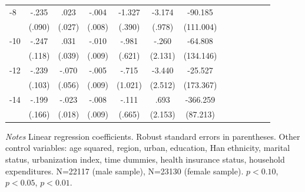 \begin{table}[p]
\begin{adjustbox}{max width=\linewidth}
\begin{threeparttable}
{\begin{tabular}{l*{6}{SS}}
-8             &    -.235\sym{***}&     .023         &    -.004         &   -1.327\sym{***}&   -3.174\sym{***}&  -90.185         \\
                &   (.090)         &   (.027)         &   (.008)         &   (.390)         &   (.978)         &(111.004)         \\
-10            &    -.247\sym{**} &     .031         &    -.010         &    -.981         &    -.260         &  -64.808         \\
                &   (.118)         &   (.039)         &   (.009)         &   (.621)         &  (2.131)         &(134.146)         \\
-12           &    -.239\sym{**} &    -.070         &    -.005         &    -.715         &   -3.440         &  -25.527         \\
                &   (.103)         &   (.056)         &   (.009)         &  (1.021)         &  (2.512)         &(173.367)         \\
-14           &    -.199         &    -.023         &    -.008         &    -.111         &     .693         & -366.259\sym{***}\\
                &   (.166)         &   (.018)         &   (.009)         &   (.665)         &  (2.153)         & (87.213)         \\      
\bottomrule
\end{tabular}
\begin{tablenotes}
\item \footnotesize \textit{Notes} Linear regression coefficients.  Robust standard errors in parentheses.
Other control variables: age squared, region, urban, education, Han ethnicity, marital status, urbanization index, time dummies, health insurance status, household expenditures. N=22117 (male sample), N=23130 (female sample). \sym{*} \(p<0.10\), \sym{**} \(p<0.05\), \sym{***} \(p<0.01\).
\end{tablenotes}
}
\end{threeparttable}
\end{adjustbox}
\end{table}


